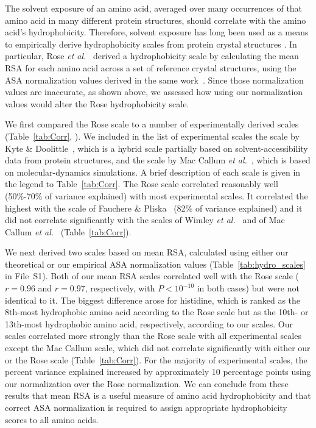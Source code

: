 \documentclass[11pt]{article}
\begin{document}
The solvent exposure of an amino acid, averaged over many occurrences of that amino acid in many different protein structures, should correlate with the amino acid's hydrophobicity. Therefore, solvent exposure has long been used as a means to empirically derive hydrophobicity scales from protein crystal structures \cite{Chothia1976,Rose1985}. In particular, Rose \emph{et al.}~\cite{Rose1985} derived a hydrophobicity scale by calculating the mean RSA for each amino acid across a set of reference crystal structures, using the ASA normalization values derived in the same work~\cite{Rose1985}. Since those normalization values are inaccurate, as shown above, we assessed how using our normalization values would alter the Rose hydrophobicity scale.

We first compared the Rose scale to a number of experimentally derived scales (Table~\ref{tab:Corr}, \cite{Wolfenden1981,Kyte1981,Fauchere1983,Radzicka1988,MacCallum2007,Moon2011,Wimley1996}). We included in the list of experimental scales the scale by Kyte \& Doolittle~\cite{Kyte1981}, which is a hybrid scale partially based on solvent-accessibility data from protein structures, and the scale by Mac Callum \emph{et al.}~\cite{MacCallum2007}, which is based on molecular-dynamics simulations. A brief description of each scale is given in the legend to Table~\ref{tab:Corr}. The Rose scale correlated reasonably well (50\%-70\% of variance explained) with most experimental scales. It correlated the highest with the scale of Fauchere \& Pliska~\cite{Fauchere1983} (82\% of variance explained) and it did not correlate significantly with the scales of Wimley \emph{et al.}~\cite{Wimley1996} and of Mac Callum \emph{et al.}~\cite{MacCallum2007} (Table~\ref{tab:Corr}).

We next derived two scales based on mean RSA, calculated using either our theoretical or our empirical ASA normalization values (Table~\ref{tab:hydro_scales} in File~S1). Both of our mean RSA scales correlated well with the Rose scale ($r=0.96$ and $r=0.97$, respectively, with $P<10^{-10}$ in both cases) but were not identical to it. The biggest difference arose for histidine, which is ranked as the 8th-most hydrophobic amino acid according to the Rose scale but as the 10th- or 13th-most hydrophobic amino acid, respectively, according to our scales. Our scales correlated more strongly than the Rose scale with all experimental scales except the Mac Callum scale, which did not correlate significantly with either our or the Rose scale (Table~\ref{tab:Corr}). For the majority of experimental scales, the percent variance explained increased by approximately 10 percentage points using our normalization over the Rose normalization. We can conclude from these results that mean RSA is a useful measure of amino acid hydrophobicity and that correct ASA normalization is required to assign appropriate hydrophobicity scores to all amino acids.
\end{document}
